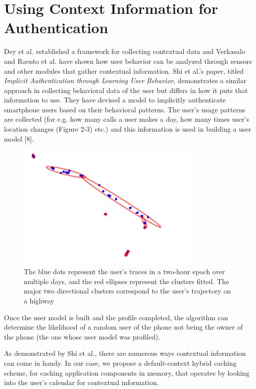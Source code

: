 \documentclass[12pt]{uthesis-v12}  %
\begin{document}
	\section{Using Context Information for Authentication}
		Dey et al. established a framework for collecting contextual data and Verkasalo and Raento et al. have shown how user behavior can be analyzed through sensors and other modules that gather contextual information. Shi et al.'s paper, titled {\em Implicit Authentication through Learning User Behavior}, demonstrates a similar approach in collecting behavioral data of the user but differs in how it puts that information to use. They have devised a model to implicitly authenticate smartphone users based on their behavioral patterns. The user's usage patterns are collected (for e.g. how many calls a user makes a day, how many times user's location changes (Figure 2-3) etc.) and this information is used in building a user model [8].  
		
		\begin{figure}[!ht]
			\centering
			\includegraphics[width = 90mm]{images/gpsTrace.png}
			\caption[User's Location Trace]
			{The blue dots represent the user’s traces in a two-hour epoch over multiple days, and the red ellipses represent the clusters fitted. The major two directional clusters correspond to the user’s trajectory on a highway}
		\end{figure}		
		Once the user model is built and the profile completed, the algorithm can determine the likelihood of a random user of the phone not being the owner of the phone (the one whose user model was profiled). 
		
		As demonstrated by Shi et al., there are numerous ways contextual information can come in handy. In our case, we propose a default-context hybrid caching scheme, for caching application components in memory, that operates by looking into the user's calendar for contextual information.  			
	
\end{document}
